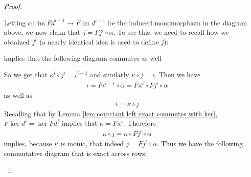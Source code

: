 \documentclass{article}
\DeclareMathOperator{\im}{im}
\DeclareMathOperator{\cok}{cok}
\begin{document}
\begin{proof}
\begin{enumerate}[(a)]
\begin{center}
    \end{center}
    Letting $\alpha:\im Fd^{i-1}\to F\im d^{i-1}$ be the induced monomorphism in the diagram above, we now claim that $j=Fj^i\circ \alpha$. To see this, we need to recall how we obtained $j^i$ (a nearly identical idea is used to define $j$):
    \begin{center}
    \end{center}
    implies that the following diagram commutes as well
    \begin{center}
    \end{center}
    So we get that $\kappa^i\circ j^i=\iota^{i-1}$ and similarly $\kappa \circ j=\iota$. Then we have
    \begin{align*}
        \iota=F\iota^{i-1}\circ \alpha =F\kappa^i\circ Fj^i \circ \alpha
    \end{align*}
    as well as
    \begin{align*}
        \iota=\kappa \circ j
    \end{align*}
    Recalling that by Lemma \ref{lem:covariant left exact commutes with ker}, $F\ker d^i=\ker Fd^i$ implies that $\kappa=F\kappa^i$. Therefore
    \begin{align*}
        \kappa \circ j=\kappa \circ Fj^i \circ \alpha
    \end{align*}
    implies, because $\kappa$ is monic, that indeed $j=Fj^i\circ \alpha$. Thus we have the following commutative diagram that is exact across rows:
    \begin{center}
\end{center}
\end{enumerate}
\end{proof}
\end{document}

